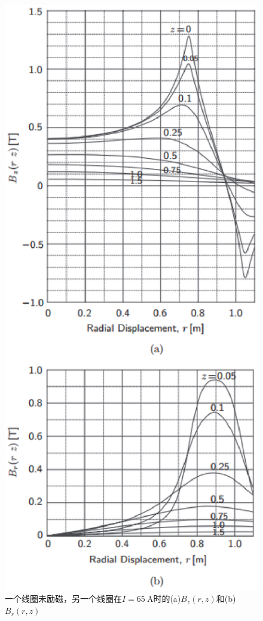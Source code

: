 \begin{figure}[htbp]
	\centering
	\includegraphics[scale=0.8]{chpt3/figs/fig3.42.eps}
	\caption{一个线圈未励磁，另一个线圈在$I =65\ \mathrm{A}$时的(a)$B_z(r, z)$和(b) $B_r(r, z)$}
\end{figure}

